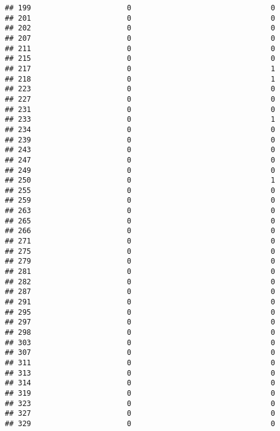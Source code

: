 \documentclass[
]{article}
\begin{document}
\begin{verbatim}
## 199                      0                                0
## 201                      0                                0
## 202                      0                                0
## 207                      0                                0
## 211                      0                                0
## 215                      0                                0
## 217                      0                                1
## 218                      0                                1
## 223                      0                                0
## 227                      0                                0
## 231                      0                                0
## 233                      0                                1
## 234                      0                                0
## 239                      0                                0
## 243                      0                                0
## 247                      0                                0
## 249                      0                                0
## 250                      0                                1
## 255                      0                                0
## 259                      0                                0
## 263                      0                                0
## 265                      0                                0
## 266                      0                                0
## 271                      0                                0
## 275                      0                                0
## 279                      0                                0
## 281                      0                                0
## 282                      0                                0
## 287                      0                                0
## 291                      0                                0
## 295                      0                                0
## 297                      0                                0
## 298                      0                                0
## 303                      0                                0
## 307                      0                                0
## 311                      0                                0
## 313                      0                                0
## 314                      0                                0
## 319                      0                                0
## 323                      0                                0
## 327                      0                                0
## 329                      0                                0

\end{verbatim}
\end{document}
